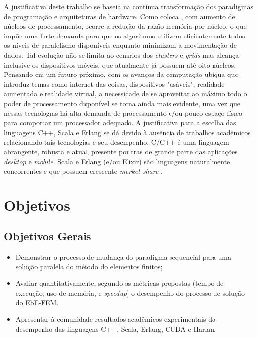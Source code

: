 \documentclass[
    12pt,               %
    openright,          %
    oneside,
    a4paper,            %
    english,            %
    french,             %
    spanish,            %
    brazil              %
    ]{abntex2}
\begin{document}
A justificativa deste trabalho se baseia na contínua transformação dos paradigmas de programação e arquiteturas de hardware. Como coloca , com aumento de núcleos de processamento, ocorre a redução da razão memória por núcleo, o que impõe uma forte demanda para que os algoritmos utilizem eficientemente todos os níveis de paralelismo disponíveis enquanto minimizam a movimentação de dados. Tal evolução não se limita ao cenários dos \textit{clusters} e \textit{grids} mas alcança inclusive os dispositivos móveis, que atualmente já possuem até oito núcleos. Pensando em um futuro próximo, com os avanços da computação ubíqua que introduz temas como internet das coisas, dispositivos "usáveis", realidade aumentada e realidade virtual, a necessidade de se aproveitar ao máximo todo o poder de processamento disponível se torna ainda mais evidente, uma vez que nessas tecnologias há alta demanda de processamento e/ou pouco espaço físico para comportar um processador adequado. A justificativa para a escolha das linguagens C++, Scala e Erlang se dá devido à ausência de trabalhos acadêmicos relacionando tais tecnologias e seu desempenho. C/C++ é uma linguagem abrangente, robusta e atual, presente por trás de grande parte das aplicações \textit{desktop} e \textit{mobile}. Scala e Erlang (e/ou Elixir) são linguagens naturalmente concorrentes e que possuem crescente \textit{market share} \nocite{erlang}\nocite{scala}.


\section{Objetivos}

\subsection{Objetivos Gerais}

	\begin{itemize}
		\item Demonstrar o processo de mudança do paradigma sequencial para uma solução paralela do método do elementos finitos;
		\item Avaliar quantitativamente, segundo as métricas propostas (tempo de execução, uso de memória, e \textit{speedup}) o desempenho do processo de solução do EbE-FEM.
		\item Apresentar à comunidade resultados acadêmicos experimentais do desempenho das  linguagens C++, Scala, Erlang, CUDA e Harlan.
	\end{itemize}
		
\end{document}

